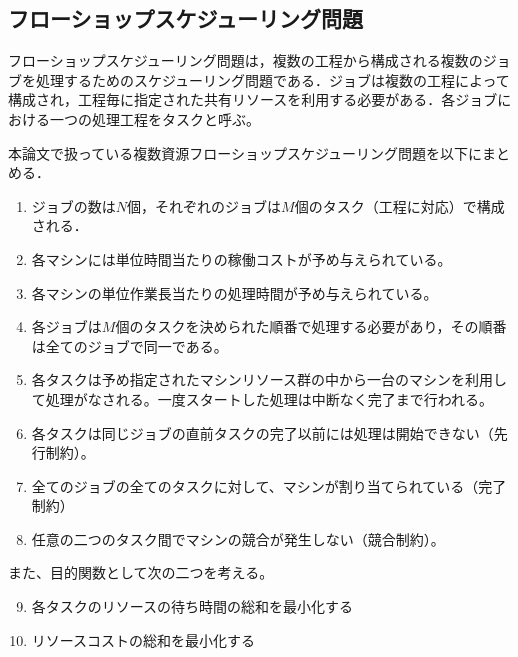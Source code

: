 \documentclass[conference]{IEEEtran}
\begin{document}
\subsection{フローショップスケジューリング問題}
フローショップスケジューリング問題は，複数の工程から構成される複数のジョブを処理するためのスケジューリング問題である．ジョブは複数の工程によって構成され，工程毎に指定された共有リソースを利用する必要がある．各ジョブにおける一つの処理工程をタスクと呼ぶ\cite{b1}。

本論文で扱っている複数資源フローショップスケジューリング問題を以下にまとめる．

\begin{enumerate}
\item ジョブの数は$N$個，それぞれのジョブは$M$個のタスク（工程に対応）で構成される．
\item 各マシンには単位時間当たりの稼働コストが予め与えられている。
\item 各マシンの単位作業長当たりの処理時間が予め与えられている。
\item 各ジョブは$M$個のタスクを決められた順番で処理する必要があり，その順番は全てのジョブで同一である。
\item 各タスクは予め指定されたマシンリソース群の中から一台のマシンを利用して処理がなされる。一度スタートした処理は中断なく完了まで行われる。
\item 各タスクは同じジョブの直前タスクの完了以前には処理は開始できない（先行制約）。
\item 全てのジョブの全てのタスクに対して、マシンが割り当てられている（完了制約）
\item 任意の二つのタスク間でマシンの競合が発生しない（競合制約）。
\end{enumerate}
また、目的関数として次の二つを考える。
\begin{enumerate}
\setcounter{enumi}{8}
\item 各タスクのリソースの待ち時間の総和を最小化する
\item リソースコストの総和を最小化する
\end{enumerate}




%
\end{document}
